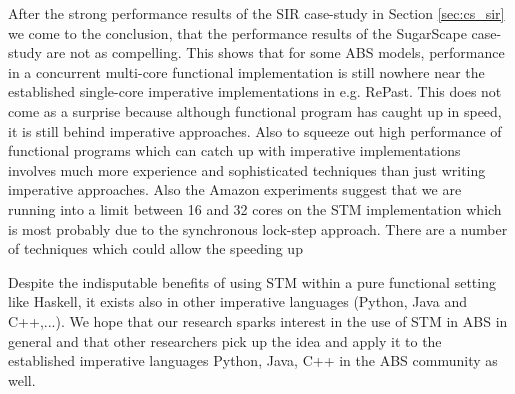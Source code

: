 After the strong performance results of the SIR case-study in Section \ref{sec:cs_sir} we come to the conclusion, that the performance results of the SugarScape case-study are not as compelling. This shows that for some ABS models, performance in a concurrent multi-core functional implementation is still nowhere near the established single-core imperative implementations in e.g. RePast. This does not come as a surprise because although functional program has caught up in speed, it is still behind imperative approaches. Also to squeeze out high performance of functional programs which can catch up with imperative implementations involves much more experience and sophisticated techniques than just writing imperative approaches.
Also the Amazon experiments suggest that we are running into a limit between 16 and 32 cores on the STM implementation which is most probably due to the synchronous lock-step approach. There are a number of techniques which could allow the speeding up 

Despite the indisputable benefits of using STM within a pure functional setting like Haskell, it exists also in other imperative languages (Python, Java and C++,...). We hope that our research sparks interest in the use of STM in ABS in general and that other researchers pick up the idea and apply it to the established imperative languages Python, Java, C++ in the ABS community as well.